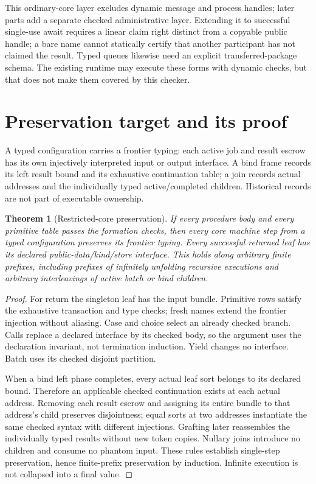 \documentclass[11pt]{article}
\newtheorem{theorem}{Theorem}
\begin{document}
This ordinary-core layer excludes dynamic message and process handles; later parts add a separate checked administrative layer. Extending it to successful single-use await requires a linear claim right distinct from a copyable public handle; a bare name cannot statically certify that another participant has not claimed the result. Typed queues likewise need an explicit transferred-package schema. The existing runtime may execute these forms with dynamic checks, but that does not make them covered by this checker.

\section{Preservation target and its proof}
A typed configuration carries a frontier typing: each active job and result escrow has its own injectively interpreted input or output interface. A bind frame records its left result bound and its exhaustive continuation table; a join records actual addresses and the individually typed active/completed children. Historical records are not part of executable ownership.

\begin{theorem}[Restricted-core preservation]
If every procedure body and every primitive table passes the formation checks, then every core machine step from a typed configuration preserves its frontier typing. Every successful returned leaf has its declared public-data/kind/store interface. This holds along arbitrary finite prefixes, including prefixes of infinitely unfolding recursive executions and arbitrary interleavings of active batch or bind children.
\end{theorem}
\begin{proof}
For return the singleton leaf has the input bundle. Primitive rows satisfy the exhaustive transaction and type checks; fresh names extend the frontier injection without aliasing. Case and choice select an already checked branch. Calls replace a declared interface by its checked body, so the argument uses the declaration invariant, not termination induction. Yield changes no interface. Batch uses its checked disjoint partition.

When a bind left phase completes, every actual leaf sort belongs to its declared bound. Therefore an applicable checked continuation exists at each actual address. Removing each result escrow and assigning its entire bundle to that address's child preserves disjointness; equal sorts at two addresses instantiate the same checked syntax with different injections. Grafting later reassembles the individually typed results without new token copies. Nullary joins introduce no children and consume no phantom input. These rules establish single-step preservation, hence finite-prefix preservation by induction. Infinite execution is not collapsed into a final value.
\end{proof}
\end{document}
